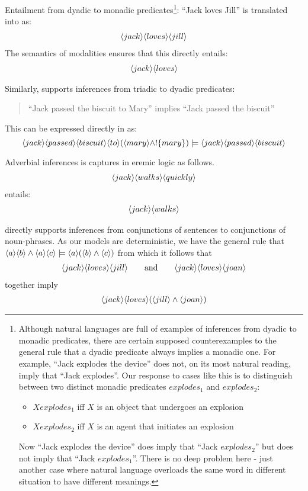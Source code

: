 \NI Entailment from dyadic to monadic predicates\footnote{Although natural languages are full of examples of inferences from dyadic to monadic predicates, there are certain supposed counterexamples to the general rule that a dyadic predicate always implies a monadic one. For example, ``Jack explodes the device'' does not, on its most natural reading, imply that ``Jack explodes''. Our response to cases like this is to distinguish between two distinct monadic predicates $explodes_1$ and $explodes_2$:
 \begin{itemize}
 \item
 $X explodes_1$ iff $X$ is an object that undergoes an explosion
 \item
 $X explodes_2$ iff $X$ is an agent that initiates an explosion
 \end{itemize}
 Now ``Jack explodes the device'' does imply that ``Jack $explodes_2$'' but does not imply that ``Jack $explodes_1$''. 
There is no deep problem here - just another case where natural language overloads the same word in different situation to have different meanings.}:
``Jack loves Jill'' is translated into \ELABR{} as:
\begin{eqnarray*}
   \langle jack \rangle \langle loves \rangle \langle jill \rangle \end{eqnarray*}
The semantics of modalities ensures that this directly entails:
\begin{eqnarray*}
   \langle jack \rangle \langle loves \rangle \end{eqnarray*}

\NI Similarly, \ELABR{} supports inferences from triadic to dyadic
predicates:
\begin{quote}
  ``Jack passed the biscuit to Mary'' implies ``Jack passed the biscuit''
\end{quote}

\NI This can be expressed directly in \ELABR{} as:
\[
   \langle jack \rangle \langle passed \rangle \langle biscuit \rangle \langle to \rangle (\langle mary \rangle \land !\{mary\}) \models \langle jack \rangle \langle passed \rangle \langle biscuit \rangle \]

\NI Adverbial inferences is captures in eremic logic as follows.
\begin{eqnarray*}
\langle jack \rangle \langle walks \rangle \langle quickly \rangle \end{eqnarray*}
entails:
\begin{eqnarray*}
\langle jack \rangle \langle walks \rangle \end{eqnarray*}

\NI \ELABR{} directly supports inferences from conjunctions of
sentences to conjunctions of noun-phrases.  As our models are
deterministic, we have the general rule that $ \langle a \rangle \langle b \rangle \land
\langle a \rangle \langle c \rangle \models \langle a \rangle (\langle b \rangle \land \langle c \rangle )$ from which
it follows that
\begin{eqnarray*}
   \langle jack \rangle \langle loves \rangle \langle jill \rangle \qquad\text{and}\qquad
   \langle jack \rangle \langle loves \rangle \langle joan \rangle \end{eqnarray*}
together imply
\begin{eqnarray*}
\langle jack \rangle \langle loves \rangle (\langle jill \rangle \land \langle joan \rangle )
\end{eqnarray*}

